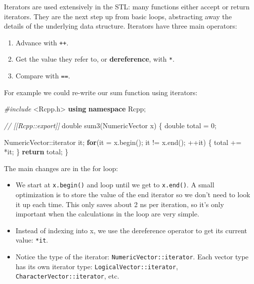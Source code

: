\documentclass[]{book}
\newenvironment{Shaded}{\begin{snugshade}}{\end{snugshade}}
\newcommand{\CommentTok}[1]{\textcolor[rgb]{0.37,0.37,0.37}{\textit{#1}}}
\newcommand{\ControlFlowTok}[1]{\textcolor[rgb]{0.27,0.27,0.27}{\textbf{#1}}}
\newcommand{\DataTypeTok}[1]{\textcolor[rgb]{0.27,0.27,0.27}{#1}}
\newcommand{\DecValTok}[1]{\textcolor[rgb]{0.06,0.06,0.06}{#1}}
\newcommand{\ImportTok}[1]{#1}
\newcommand{\KeywordTok}[1]{\textcolor[rgb]{0.27,0.27,0.27}{\textbf{#1}}}
\newcommand{\NormalTok}[1]{#1}
\newcommand{\PreprocessorTok}[1]{\textcolor[rgb]{0.37,0.37,0.37}{\textit{#1}}}
\providecommand{\tightlist}{%
  \setlength{\itemsep}{0pt}\setlength{\parskip}{0pt}}
\begin{document}
Iterators are used extensively in the STL: many functions either accept or return iterators. They are the next step up from basic loops, abstracting away the details of the underlying data structure. Iterators have three main operators: 

\begin{enumerate}
\def\labelenumi{\arabic{enumi}.}
\tightlist
\item
  Advance with \texttt{++}.
\item
  Get the value they refer to, or \textbf{dereference}, with \texttt{*}.
\item
  Compare with \texttt{==}.
\end{enumerate}

For example we could re-write our sum function using iterators:

\begin{Shaded}
\begin{Highlighting}[]
\PreprocessorTok{#include }\ImportTok{<Rcpp.h>}
\KeywordTok{using} \KeywordTok{namespace}\NormalTok{ Rcpp;}

\CommentTok{// [[Rcpp::export]]}
\DataTypeTok{double}\NormalTok{ sum3(NumericVector x) \{}
  \DataTypeTok{double}\NormalTok{ total = }\DecValTok{0}\NormalTok{;}
  
\NormalTok{  NumericVector::iterator it;}
  \ControlFlowTok{for}\NormalTok{(it = x.begin(); it != x.end(); ++it) \{}
\NormalTok{    total += *it;}
\NormalTok{  \}}
  \ControlFlowTok{return}\NormalTok{ total;}
\NormalTok{\}}
\end{Highlighting}
\end{Shaded}

The main changes are in the for loop:

\begin{itemize}
\item
  We start at \texttt{x.begin()} and loop until we get to \texttt{x.end()}. A small
  optimization is to store the value of the end iterator so we don't need to
  look it up each time. This only saves about 2 ns per iteration, so it's only
  important when the calculations in the loop are very simple.
\item
  Instead of indexing into x, we use the dereference operator to get its
  current value: \texttt{*it}.
\item
  Notice the type of the iterator: \texttt{NumericVector::iterator}. Each vector
  type has its own iterator type: \texttt{LogicalVector::iterator},
  \texttt{CharacterVector::iterator}, etc.
\end{itemize}
\end{document}
